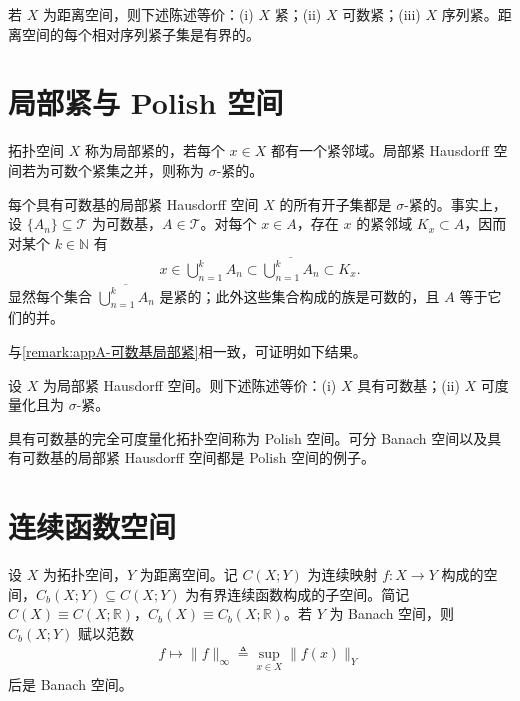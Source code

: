 \documentclass[../main.tex]{subfiles}
\begin{document}
若 $X$ 为距离空间，则下述陈述等价：(i) $X$ 紧；(ii) $X$ 可数紧；(iii) $X$ 序列紧。距离空间的每个相对序列紧子集是有界的。

\section{局部紧与 Polish 空间}\label{section:appA-局部紧Polish}\label{subsection:appA-Polish}

\begin{definition}\label{definition:appA-局部紧}
拓扑空间 $X$ 称为局部紧的，若每个 $x\in X$ 都有一个紧邻域。局部紧 Hausdorff 空间若为可数个紧集之并，则称为 $\sigma$-紧的。
\end{definition}

\begin{remark}\label{remark:appA-可数基局部紧}
每个具有可数基的局部紧 Hausdorff 空间 $X$ 的所有开子集都是 $\sigma$-紧的。事实上，设 $\{A_n\}\subseteq\mathscr{T}$ 为可数基，$A\in\mathscr{T}$。对每个 $x\in A$，存在 $x$ 的紧邻域 $K_x\subset A$，因而对某个 $k\in\mathbb{N}$ 有
\begin{align*}
x\in\bigcup_{n=1}^k A_n\subset\overline{\bigcup_{n=1}^k A_n}\subset K_x.
\end{align*}
显然每个集合 $\overline{\bigcup_{n=1}^k A_n}$ 是紧的；此外这些集合构成的族是可数的，且 $A$ 等于它们的并。
\end{remark}

与\cref{remark:appA-可数基局部紧}相一致，可证明如下结果。

\begin{proposition}\label{proposition:appA-局部紧基}\label{proposition:appA-σ紧}\label{proposition:appA-紧生成}
设 $X$ 为局部紧 Hausdorff 空间。则下述陈述等价：(i) $X$ 具有可数基；(ii) $X$ 可度量化且为 $\sigma$-紧。
\end{proposition}

\begin{definition}[Polish 空间]\label{definition:appA-Polish}
具有可数基的完全可度量化拓扑空间称为 Polish 空间。可分 Banach 空间以及具有可数基的局部紧 Hausdorff 空间都是 Polish 空间的例子。
\end{definition}

\section{连续函数空间}\label{section:appA-连续函数空间}

\begin{definition}[连续函数空间 $C$ 与 $C_b$]\label{definition:appA-C与Cb}
设 $X$ 为拓扑空间，$Y$ 为距离空间。记 $C(X;Y)$ 为连续映射 $f:X\to Y$ 构成的空间，$C_b(X;Y)\subseteq C(X;Y)$ 为有界连续函数构成的子空间。简记 $C(X)\equiv C(X;\mathbb{R})$，$C_b(X)\equiv C_b(X;\mathbb{R})$。若 $Y$ 为 Banach 空间，则 $C_b(X;Y)$ 赋以范数
\begin{align*}
f\mapsto\|f\|_\infty\triangleq \sup_{x\in X}\|f(x)\|_Y
\end{align*}
后是 Banach 空间。
\end{definition}
\end{document}
